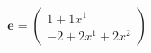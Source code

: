 \documentclass[preview]{standalone}
\begin{document}
\begin{align*}
\mathbf{e} = \begin{pmatrix}1 + 1x^{1} \\ -2 + 2x^{1} + 2x^{2}\end{pmatrix}
\end{align*}
\end{document}
